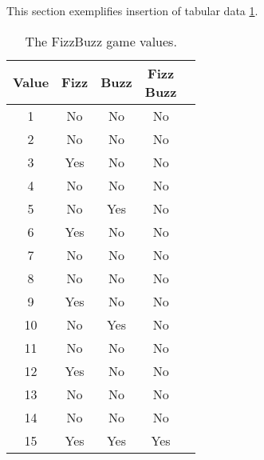 
This section exemplifies insertion of tabular data \ref{tbl:tbl}.

\begin{table}[h]
  \centering
  \begin{tabular}{| c | c | c | c | c |}
    \hline
    \textbf{Value} & \textbf{Fizz} & \textbf{Buzz} & \specialcell[t]{\textbf{Fizz} \\ \textbf{Buzz}} \\ \hline \hline
    1 & No & No & No \\ \hline
    2 & No & No & No \\ \hline
    3 & Yes & No & No \\ \hline
    4 & No & No & No \\ \hline
    5 & No & Yes & No \\ \hline
    6 & Yes & No & No \\ \hline
    7 & No & No & No \\ \hline
    8 & No & No & No \\ \hline
    9 & Yes & No & No \\ \hline
    10 & No & Yes & No \\ \hline
    11 & No & No & No \\ \hline
    12 & Yes & No & No \\ \hline
    13 & No & No & No \\ \hline
    14 & No & No & No \\ \hline
    15 & Yes & Yes & Yes \\ \hline
  \end{tabular}
  \caption{The FizzBuzz game values.}
  \label{tbl:tbl}
\end{table}
